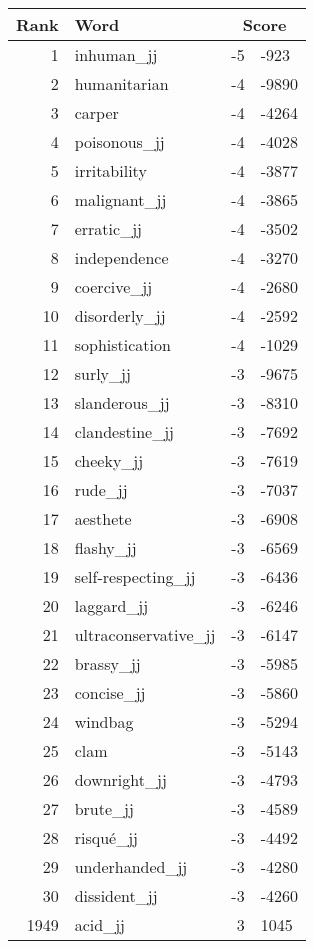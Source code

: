 \begin{longtable}[!htbp]{| rlr@{.}l |}
    \hline
    \textbf{Rank} & \textbf{Word} & \multicolumn{2}{c|}{\textbf{Score}} \\
    \hline
    \endhead
    1 & inhuman\_jj & -5 & -923 \\
    2 & humanitarian & -4 & -9890 \\
    3 & carper & -4 & -4264 \\
    4 & poisonous\_jj & -4 & -4028 \\
    5 & irritability & -4 & -3877 \\
    6 & malignant\_jj & -4 & -3865 \\
    7 & erratic\_jj & -4 & -3502 \\
    8 & independence & -4 & -3270 \\
    9 & coercive\_jj & -4 & -2680 \\
    10 & disorderly\_jj & -4 & -2592 \\
    11 & sophistication & -4 & -1029 \\
    12 & surly\_jj & -3 & -9675 \\
    13 & slanderous\_jj & -3 & -8310 \\
    14 & clandestine\_jj & -3 & -7692 \\
    15 & cheeky\_jj & -3 & -7619 \\
    16 & rude\_jj & -3 & -7037 \\
    17 & aesthete & -3 & -6908 \\
    18 & flashy\_jj & -3 & -6569 \\
    19 & self-respecting\_jj & -3 & -6436 \\
    20 & laggard\_jj & -3 & -6246 \\
    21 & ultraconservative\_jj & -3 & -6147 \\
    22 & brassy\_jj & -3 & -5985 \\
    23 & concise\_jj & -3 & -5860 \\
    24 & windbag & -3 & -5294 \\
    25 & clam & -3 & -5143 \\
    26 & downright\_jj & -3 & -4793 \\
    27 & brute\_jj & -3 & -4589 \\
    28 & risqué\_jj & -3 & -4492 \\
    29 & underhanded\_jj & -3 & -4280 \\
    30 & dissident\_jj & -3 & -4260 \\
    1949 & acid\_jj & 3 & 1045 \\

\end{longtable}
